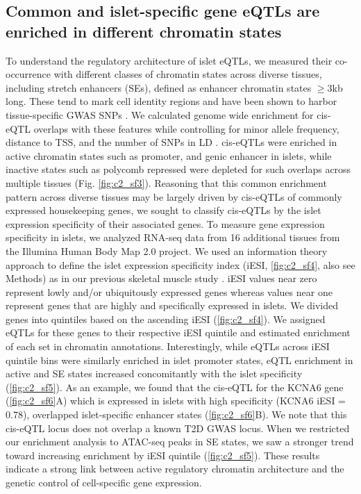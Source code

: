 \subsection{Common and islet-specific gene eQTLs are enriched in different chromatin states} 
To understand the regulatory architecture of islet eQTLs, we measured their co-occurrence with different classes of chromatin states across diverse tissues, including stretch enhancers (SEs), defined as enhancer chromatin states $\geq$3kb long. These tend to mark cell identity regions and have been shown to harbor tissue-specific GWAS SNPs \cite{parkerChromatinStretchEnhancer2013, quangMotifSignaturesStretch2015}. We calculated genome wide enrichment for cis-eQTL overlaps with these features while controlling for minor allele frequency, distance to TSS, and the number of SNPs in LD \cite{schmidtGREGOREvaluatingGlobal2015}. cis-eQTLs were enriched in active chromatin states such as promoter, and genic enhancer in islets, while inactive states such as polycomb repressed were depleted for such overlaps across multiple tissues (Fig. \ref{fig:c2_sf3}). Reasoning that this common enrichment pattern across diverse tissues may be largely driven by cis-eQTLs of commonly expressed housekeeping genes, we sought to classify cis-eQTLs by the islet expression specificity of their associated genes. To measure gene expression specificity in islets, we analyzed RNA-seq data from 16 additional tissues from the Illumina Human Body Map 2.0 project. We used an information theory approach to define the islet expression specificity index (iESI, \ref{fig:c2_sf4}, also see Methods) as in our previous skeletal muscle study \cite{scottGeneticRegulatorySignature2016}. iESI values near zero represent lowly and/or ubiquitously expressed genes whereas values near one represent genes that are highly and specifically expressed in islets. We divided genes into quintiles based on the ascending iESI (\ref{fig:c2_sf4}). We assigned eQTLs for these genes to their respective iESI quintile and estimated enrichment of each set in chromatin annotations. Interestingly, while eQTLs across iESI quintile bins were similarly enriched in islet promoter states, eQTL enrichment in active and SE states increased concomitantly with the islet specificity (\ref{fig:c2_sf5}). As an example, we found that the cis-eQTL for the KCNA6 gene (\ref{fig:c2_sf6}A) which is expressed in islets with high specificity (KCNA6 iESI = 0.78), overlapped islet-specific enhancer states (\ref{fig:c2_sf6}B). We note that this cis-eQTL locus does not overlap a known T2D GWAS locus. When we restricted our enrichment analysis to ATAC-seq peaks in SE states, we saw a stronger trend toward increasing enrichment by iESI quintile (\ref{fig:c2_sf5}). These results indicate a strong link between active regulatory chromatin architecture and the genetic control of cell-specific gene expression.


